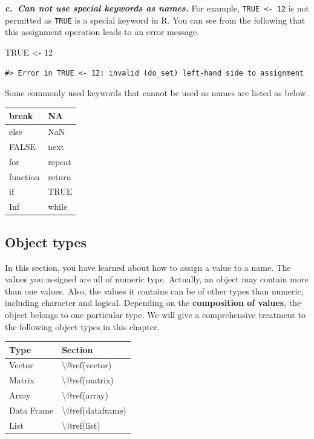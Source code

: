 \documentclass[
]{book}
\newenvironment{Shaded}{\begin{snugshade}}{\end{snugshade}}
\newcommand{\ConstantTok}[1]{\textcolor[rgb]{0.00,0.00,0.00}{#1}}
\newcommand{\DecValTok}[1]{\textcolor[rgb]{0.00,0.00,0.81}{#1}}
\newcommand{\OtherTok}[1]{\textcolor[rgb]{0.56,0.35,0.01}{#1}}
\begin{document}
\textbf{\emph{c.~Can not use special keywords as names.}}
For example, \texttt{TRUE\ \textless{}-\ 12} is not permitted as \texttt{TRUE} is a special keyword in R. You can see from the following that this assignment operation leads to an error message.

\begin{Shaded}
\begin{Highlighting}[]
\ConstantTok{TRUE} \OtherTok{\textless{}{-}} \DecValTok{12}
\end{Highlighting}
\end{Shaded}

\begin{verbatim}
#> Error in TRUE <- 12: invalid (do_set) left-hand side to assignment
\end{verbatim}

Some commonly used keywords that cannot be used as names are listed as below.

\begin{tabular}{l|l}
\hline
break & NA\\
\hline
else & NaN\\
\hline
FALSE & next\\
\hline
for & repeat\\
\hline
function & return\\
\hline
if & TRUE\\
\hline
Inf & while\\
\hline
\end{tabular}

\hypertarget{object-types}{%
\subsection{Object types}\label{object-types}}

In this section, you have learned about how to assign a value to a name. The values you assigned are all of numeric type. Actually, an object may contain more than one values. Also, the values it contains can be of other types than numeric, including character and logical. Depending on the \textbf{composition of values}, the object belongs to one particular type. We will give a comprehensive treatment to the following object types in this chapter.

\begin{tabular}{l|l}
\hline
Type & Section\\
\hline
Vector & \textbackslash{}@ref(vector)\\
\hline
Matrix & \textbackslash{}@ref(matrix)\\
\hline
Array & \textbackslash{}@ref(array)\\
\hline
Data Frame & \textbackslash{}@ref(dataframe)\\
\hline
List & \textbackslash{}@ref(list)\\
\hline
\end{tabular}
\end{document}
